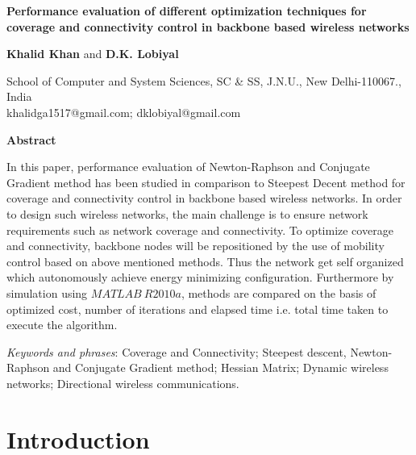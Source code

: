 \documentclass[11pt]{article}
\numberwithin{equation}{section}
\begin{document}
\bigskip

\bigskip

\begin{center}
{\Large \textbf{Performance evaluation of different optimization techniques for coverage and connectivity control in backbone based wireless networks}}

\bigskip

\textbf{Khalid Khan} and \textbf{D.K. Lobiyal}

School of Computer and System Sciences, SC \& SS, J.N.U., New Delhi-110067., India\\[0pt]

 khalidga1517@gmail.com; dklobiyal@gmail.com \\[0pt]

\bigskip

\bigskip


\textbf{Abstract}
\end{center}

\parindent=8mm {\footnotesize {In this paper, performance evaluation of Newton-Raphson and Conjugate Gradient method has been studied in comparison to Steepest Decent method for coverage and connectivity control in backbone based wireless networks. In order to design such wireless networks, the main challenge is to ensure network requirements such as network coverage and connectivity. To optimize coverage and connectivity, backbone nodes will be repositioned by the use of mobility control based on above mentioned methods. Thus the network get self organized which autonomously achieve energy minimizing configuration. Furthermore by simulation using $MATLAB ~R2010a$, methods are compared on the basis of optimized cost, number of iterations and elapsed time i.e. total time taken to execute the algorithm.}}

\bigskip

{\footnotesize \emph{Keywords and phrases}: Coverage and Connectivity; Steepest descent, Newton-Raphson and Conjugate Gradient method;  Hessian Matrix; Dynamic wireless networks; Directional wireless communications.}


\bigskip



\section {Introduction}
\end{document}
